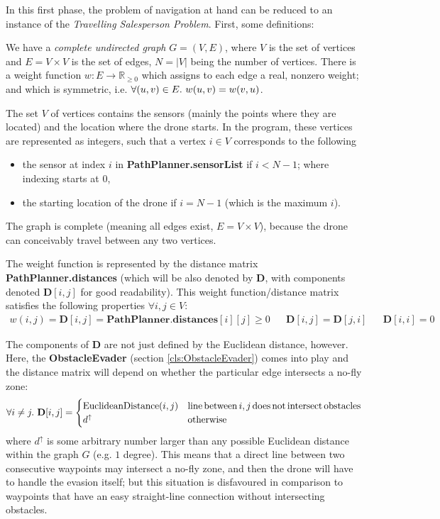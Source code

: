\documentclass{article}
\newcommand{\sref}[1]{(section \ref{#1})}
\begin{document}
In this first phase, the problem of navigation at hand can be reduced to an instance of the \textit{Travelling Salesperson Problem}. First, some definitions:

We have a \textit{complete undirected graph} $G=(V,E)$, where $V$ is the set of vertices and $E = V \times V$ is the set of edges, $N = |V|$ being the number of vertices. There is a weight function $w: E \to \mathbb{R}_{\ge 0}$ which assigns to each edge a real, nonzero weight; and which is symmetric, i.e. $\forall (u, v) \in E\ldotp\, w(u,v) = w(v,u)$.

The set $V$ of vertices contains the sensors (mainly the points where they are located) and the location where the drone starts. In the program, these vertices are represented as integers, such that a vertex $i \in V$ corresponds to the following
\begin{itemize}
\item the sensor at index $i$ in \textbf{PathPlanner.sensorList} if $i < N - 1$; where indexing starts at $0$,
\item the starting location of the drone if $i = N - 1$ (which is the maximum $i$).
\end{itemize}

The graph is complete (meaning all edges exist, $E = V \times V$), because the drone can conceivably travel between any two vertices.

The weight function is represented by the distance matrix \textbf{PathPlanner.distances} (which will be also denoted by $\mathbf{D}$, with components denoted $\mathbf{D}[i,j]$ for good readability). This weight function/distance matrix satisfies the following properties $\forall i,j \in V$:
\begin{align*}
  w(i,j)=\mathbf{D}[i,j]=\mathrm{\mathbf{PathPlanner.distances}}[i][j] \ge 0 && \mathbf{D}[i,j] = \mathbf{D}[j,i] && \mathbf{D}[i,i] = 0
\end{align*}

The components of $\mathbf{D}$ are not just defined by the Euclidean distance, however. Here, the \textbf{ObstacleEvader} \sref{cls:ObstacleEvader} comes into play and the distance matrix will depend on whether the particular edge intersects a no-fly zone:
\[
  \forall i\ne j \ldotp\, \mathbf{D}[i,j] =
  \begin{cases}
    \mathrm{EuclideanDistance}(i,j) & \mathrm{line\,between}\,i,j\,\mathrm{does\,not\,intersect\,obstacles} \\
    d^{\uparrow} & \mathrm{otherwise}
  \end{cases}
\]
where $d^{\uparrow}$ is some arbitrary number larger than any possible Euclidean distance within the graph $G$ (e.g. $1$ degree). This means that a direct line between two consecutive waypoints may intersect a no-fly zone, and then the drone will have to handle the evasion itself; but this situation is disfavoured in comparison to waypoints that have an easy straight-line connection without intersecting obstacles.
\end{document}
